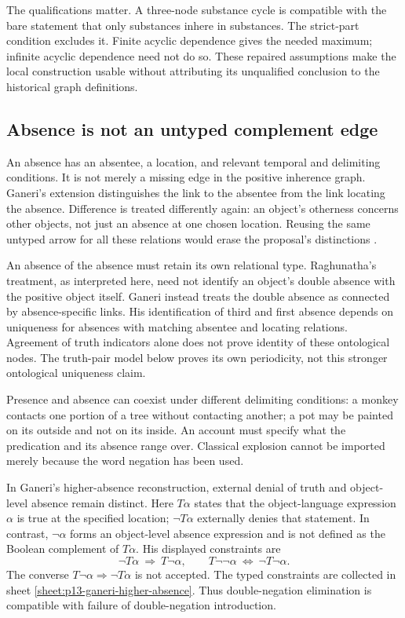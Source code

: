 The qualifications matter. A three-node substance cycle is compatible with
the bare statement that only substances inhere in substances. The
strict-part condition excludes it. Finite acyclic dependence gives the
needed maximum; infinite acyclic dependence need not do so. These repaired
assumptions make the local construction usable without attributing its
unqualified conclusion to the historical graph definitions.

\subsection{Absence is not an untyped complement edge}

An absence has an absentee, a location, and relevant temporal and
delimiting conditions. It is not merely a missing edge in the positive
inherence graph. Ganeri's extension distinguishes the link to the absentee
from the link locating the absence. Difference is treated differently
again: an object's otherness concerns other objects, not just an absence
at one chosen location. Reusing the same untyped arrow for all these
relations would erase the proposal's distinctions
\cite[pp.~377--385]{Ganeri2004IndianLogicPublished}.

An absence of the absence must retain its own relational type.
Raghunatha's treatment, as interpreted here, need not identify an object's
double absence with the positive object itself. Ganeri instead treats
the double absence as connected by absence-specific links.
His identification of third and first absence depends on uniqueness
for absences with matching absentee and locating relations.
Agreement of truth indicators alone does not prove identity of these
ontological nodes. The truth-pair model below proves its own periodicity,
not this stronger ontological uniqueness claim.

Presence and absence can coexist under different delimiting conditions:
a monkey contacts one portion of a tree without contacting another;
a pot may be painted on its outside and not on its inside.
An account must specify what the predication and its absence range over.
Classical explosion cannot be imported merely because the word
negation has been used.

In Ganeri's higher-absence reconstruction, external denial of truth and
object-level absence remain distinct. Here \(T\alpha\) states that the
object-language expression \(\alpha\) is true at the specified location;
\(\neg T\alpha\) externally denies that statement. In contrast,
\(\neg\alpha\) forms an object-level absence expression and is not
defined as the Boolean complement of \(T\alpha\).
His displayed constraints are
\[
 \neg T\alpha\ \Longrightarrow\ T\neg\alpha,\qquad
 T\neg\neg\alpha\ \Longleftrightarrow\ \neg T\neg\alpha.
\]
The converse \(T\neg\alpha\Rightarrow\neg T\alpha\) is not accepted.
The typed constraints are collected in sheet \ref{sheet:p13-ganeri-higher-absence}.
Thus double-negation elimination is compatible with failure of
double-negation introduction.

